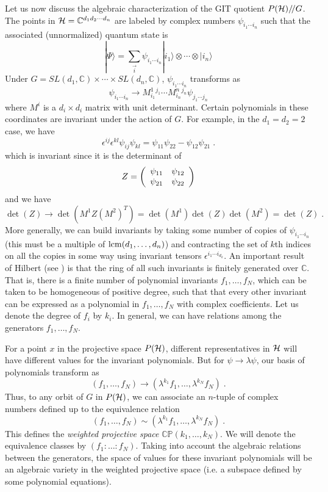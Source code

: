 \documentclass[12pt]{article}
\theoremstyle{definition}
\newcommand{\be}{\begin{equation}}
\newcommand{\ee}{\end{equation}}
\newcommand{\ba}{\begin{array}}
\newcommand{\ea}{\end{array}}
\newcommand{\GITquot}{/\!/}
\begin{document}
Let us now discuss the algebraic characterization of the GIT quotient $P({\cal H})\GITquot G$. The points in ${\cal H} = \mathbb{C}^{d_1 d_2 \cdots d_n}$ are labeled by complex numbers $\psi_{i_{1} \cdots i_n}$ such that the associated (unnormalized) quantum state is
\be
|\Psi \rangle = \sum_{\vec{i}} \psi_{i_1 \cdots i_n} |i_1 \rangle \otimes \cdots \otimes |i_n \rangle
\ee
Under $G = SL(d_1,\mathbb{C}) \times \cdots \times SL(d_n,\mathbb{C})$, $\psi_{i_{1} \cdots i_n}$ transforms as
\be
\psi_{i_1 \cdots i_n} \to M^1_{i_1} {}^{j_1} \cdots M^n_{i_n} {}^{j_n} \psi_{j_1 \cdots j_n}
\ee
where $M^i$ is a $d_i \times d_i$ matrix with unit determinant. Certain polynomials in these coordinates are invariant under the action of $G$. For example, in the $d_1 = d_2 = 2$ case, we have
\be
\epsilon^{ij} \epsilon^{kl} \psi_{ij} \psi_{kl} = \psi_{11} \psi_{22} - \psi_{12} \psi_{21} \; .
\ee
which is invariant since it is the determinant of
\be
Z = \left( \ba{cc} \psi_{11} & \psi_{12} \cr \psi_{21} & \psi_{22} \ea \right)
\ee
and we have
\be
\det(Z) \to \det(M^1 Z (M^2)^T) = \det(M^1) \det(Z) \det(M^2) = \det(Z) \; .
\ee
More generally, we can build invariants by taking some number  of copies of $\psi_{i_1 \cdots i_n}$ (this must be a multiple of ${\rm lcm}(d_1, \dots, d_n)$) and contracting the set of $k$th indices on all the copies in some way using invariant tensors $\epsilon^{i_1 \cdots i_{d_k}}$. An important result of Hilbert (see \cite{mfk,dc}) is that the ring of all such invariants is finitely generated over $\mathbb C$. That is, there is a finite number of polynomial invariants $f_1, \dots, f_N$, which can be taken to be homogeneous of positive degree, such that that every other invariant can be expressed as a polynomial in $f_1, \dots, f_N$ with complex coefficients. Let us denote the degree of $f_i$ by $k_i$. In general, we can have relations among the generators $f_1, \dots, f_N$.

For a point $x$ in the projective space $P({\cal H})$, different representatives in ${\cal H}$ will have different values for the invariant polynomials. But for $\psi \to \lambda \psi$, our basis of polynomials transform as
\be
(f_1,\dots,f_N) \to  (\lambda^{k_1} f_1,\dots, \lambda^{k_N} f_N) \; .
\ee
Thus, to any orbit of $G$ in $P({\cal H})$, we can associate an $n$-tuple of complex numbers defined up to the equivalence relation
\be
(f_1,\dots,f_N) \sim  (\lambda^{k_1} f_1,\dots, \lambda^{k_N} f_N) \; .
\ee
This defines the {\it  weighted projective space} $\mathbb{C P}(k_1,\dots,k_N)$. We will denote the equivalence classes by $(f_1:\dots:f_N)$. Taking into account the algebraic relations between the generators, the space of values for these invariant polynomials will be an algebraic variety in the weighted projective space (i.e. a subspace defined by some polynomial equations).
\end{document}
